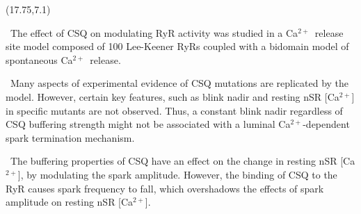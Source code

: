 \documentclass[a0]{a0poster}
\def\Ca{Ca$^{2+}$}
\def\Head#1{\noindent{\begin{center}\LARGE\color{DarkBlue} #1\end{center}}}
\begin{document}
\begin{textblock}{5.5}(17.75,7.1)
\Head{--- Conclusions ---}

\ The effect of CSQ on modulating RyR activity was studied in a \Ca\ release site model composed of 100 Lee-Keener RyRs coupled with a bidomain model of spontaneous \Ca\ release.

\ Many aspects of experimental evidence of CSQ mutations are replicated by the model. However, certain key features, such as blink nadir and resting nSR [\Ca] in specific mutants are not observed. Thus, a constant blink nadir regardless of CSQ buffering strength might not be associated with a luminal \Ca-dependent spark termination mechanism.

\ The buffering properties of CSQ have an effect on the change in resting nSR [\Ca], by modulating the spark amplitude. However, the binding of CSQ to the RyR causes spark frequency to fall, which overshadows the effects of spark amplitude on resting nSR [\Ca].








\end{textblock}
\end{document}
